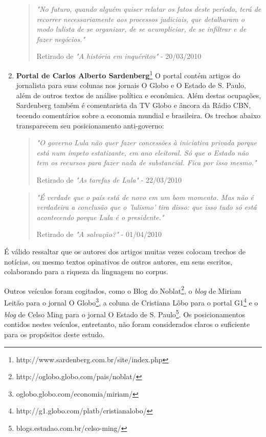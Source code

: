 \begin{enumerate}
\begin{quote}

\emph{"No futuro, quando alguém quiser relatar os fatos deste período, terá de recorrer necessariamente aos processos judiciais, que detalharam o modo lulista de se organizar, de se acumpliciar, de se infiltrar e de fazer negócios."}

{\small Retirado de \emph{"A história em inquéritos"} - 20/03/2010}
\end{quote}

\item \textbf{Portal de Carlos Alberto Sardenberg}\footnote{http://www.sardenberg.com.br/site/index.php} O portal contém artigos do jornalista para suas colunas nos jornais O Globo e O Estado de S. Paulo, além de outros textos de análise política e econômica. Além destas ocupações, Sardenberg também é comentarista da TV Globo e âncora da Rádio CBN, tecendo comentários sobre a economia mundial e brasileira. Os trechos abaixo transparecem seu posicionamento anti-governo: 

\begin{quote}

\emph{"O governo Lula não quer fazer concessões à iniciativa privada porque está num ímpeto estatizante, em ano eleitoral. Só que o Estado não tem os recursos para fazer nada de substancial. Fica por isso mesmo."}

{\small Retirado de \emph{"As tarefas de Lula"} - 22/03/2010}
\end{quote}

\begin{quote}

\emph{"É verdade que o país está de novo em um bom momento. Mas não é verdadeira a conclusão que o 'lulismo' tira disso: que isso tudo só está acontecendo porque Lula é o presidente."}

{\small Retirado de \emph{"A salvação?"} - 01/04/2010}
\end{quote}
\end{enumerate}

É válido ressaltar que os autores dos artigos muitas vezes colocam trechos de notícias, ou mesmo textos opinativos de outros autores, em seus escritos, colaborando para a riqueza da linguagem no corpus.

Outros veículos foram cogitados, como o Blog do Noblat\footnote{http://oglobo.globo.com/pais/noblat/}, o \emph{blog} de Miriam Leitão para o jornal O Globo\footnote{oglobo.globo.com/economia/miriam/}, a coluna de Cristiana Lôbo para o portal G1\footnote{http://g1.globo.com/platb/cristianalobo/} e o \emph{blog} de Celso Ming para o jornal O Estado de S. Paulo\footnote{blogs.estadao.com.br/celso-ming/ }. Os posicionamentos contidos nestes veículos, entretanto, não foram considerados claros o suficiente para os propósitos deste estudo. 

